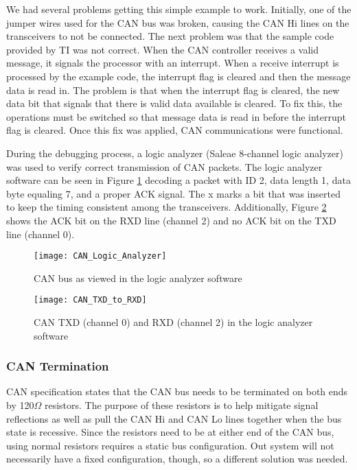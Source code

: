 \noindent We had several problems getting this simple example to work. Initially, one of the jumper wires used for the CAN bus was broken, causing the CAN Hi lines on the transceivers to not be connected. The next problem was that the sample code provided by TI was not correct. When the CAN controller receives a valid message, it signals the processor with an interrupt. When a receive interrupt is processed by the example code, the interrupt flag is cleared and then the message data is read in. The problem is that when the interrupt flag is cleared, the new data bit that signals that there is valid data available is cleared. To fix this, the operations must be switched so that message data is read in before the interrupt flag is cleared. Once this fix was applied, CAN communications were functional. 

\noindent During the debugging process, a logic analyzer (Saleae 8-channel logic analyzer) was used to verify correct transmission of CAN packets. The logic analyzer software can be seen in Figure \ref{fig:can_logic_analyzer} decoding a packet with ID 2, data length 1, data byte equaling 7, and a proper ACK signal. The x marks a bit that was inserted to keep the timing consistent among the transceivers. Additionally, Figure \ref{fig:can_TXD_RXD} shows the ACK bit on the RXD line (channel 2) and no ACK bit on the TXD line (channel 0).

\begin{figure}[H]
	\centering
	\texttt{[image: CAN\_Logic\_Analyzer]}
	\caption{CAN bus as viewed in the logic analyzer software}
	\label{fig:can_logic_analyzer}
\end{figure}

\begin{figure}[H]
	\centering
	\texttt{[image: CAN\_TXD\_to\_RXD]}
	\caption{CAN TXD (channel 0) and RXD (channel 2) in the logic analyzer software}
	\label{fig:can_TXD_RXD}
\end{figure}

\subsubsection{CAN Termination}
CAN specification states that the CAN bus needs to be terminated on both ends by 120$\Omega$ resistors. The purpose of these resistors is to help mitigate signal reflections as well as pull the CAN Hi and CAN Lo lines together when the bus state is recessive. Since the resistors need to be at either end of the CAN bus, using normal resistors requires a static bus configuration. Out system will not necessarily have a fixed configuration, though, so a different solution was needed.

